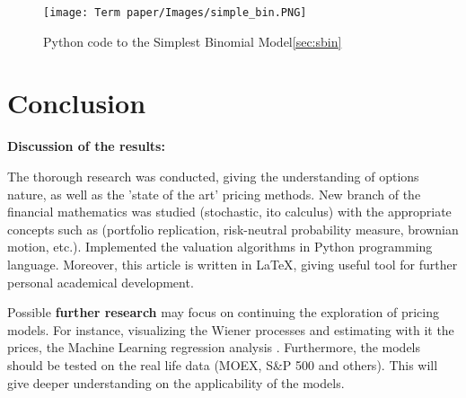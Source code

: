 \documentclass[11pt]{article}
\begin{document}
\begin{figure}[H]
  \centering
  \texttt{[image: Term paper/Images/simple\_bin.PNG]}
  \caption{Python code to the Simplest Binomial Model\protect\ref{sec:sbin}}
  \label{fig:out4}
\end{figure}
\vfill
\section{Conclusion}
\textbf{Discussion of the results:}
\par The thorough research was conducted, giving the understanding of options nature, as well as the 'state of the art' pricing methods. New branch of the financial mathematics was studied (stochastic, ito calculus) with the appropriate concepts such as (portfolio replication, risk-neutral probability measure, brownian motion, etc.). Implemented the valuation algorithms in Python programming language. Moreover, this article is written in \LaTeX, giving useful tool for further personal academical development.
\par Possible \textbf{further research} may focus on continuing the exploration of pricing models. For instance, visualizing the Wiener processes and estimating with it the prices, the Machine Learning regression analysis \cite{C_21}. Furthermore, the models should be tested on the real life data (MOEX, S\&P 500 and others). This will give deeper understanding on the applicability of the models.

\newpage

 
\end{document}
